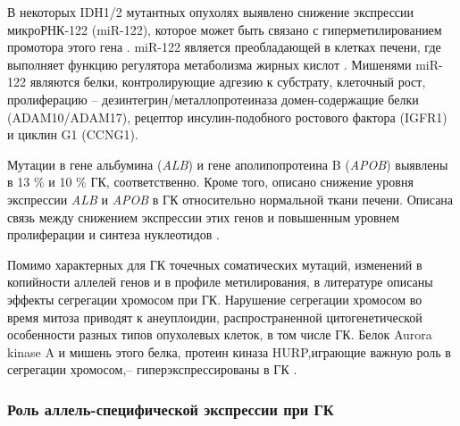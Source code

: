 В некоторых IDH1/2 мутантных опухолях выявлено снижение экспрессии микроРНК-122 (miR-122), которое может быть связано с гиперметилированием промотора этого гена \cite{cancer_genome_atlas_research_network._electronic_address:_wheelerbcm.edu_comprehensive_2017}. miR-122 является преобладающей в клетках печени, где выполняет функцию регулятора метаболизма жирных кислот \cite{liu_mir-122_2014}. Мишенями miR-122 являются белки, контролирующие адгезию к субстрату, клеточный рост, пролиферацию – дезинтегрин/металлопротеиназа домен-содержащие белки (ADAM10/ADAM17), рецептор инсулин-подобного ростового фактора (IGFR1) и циклин G1 (CCNG1).

Мутации в гене альбумина (\textit{ALB}) и гене аполипопротеина B (\textit{APOB}) выявлены в 13 \% и 10 \% ГК, соответственно. Кроме того, описано снижение уровня экспрессии \textit{ALB} и \textit{APOB} в ГК относительно нормальной ткани печени. Описана связь между снижением экспрессии этих генов и повышенным уровнем пролиферации и синтеза нуклеотидов \cite{cancer_genome_atlas_research_network._electronic_address:_wheelerbcm.edu_comprehensive_2017}.

Помимо характерных для ГК точечных соматических мутаций, изменений в копийности аллелей генов и в профиле метилирования, в литературе описаны эффекты сегрегации хромосом при ГК. Нарушение сегрегации хромосом во время митоза приводят к анеуплоидии, распространенной цитогенетической особенности разных типов опухолевых клеток, в том числе ГК. Белок Aurora kinase A и мишень этого белка, протеин киназа HURP,играющие важную роль в сегрегации хромосом,– гиперэкспрессированы в ГК \cite{farazi_hepatocellular_2006}.

\subsubsection{Роль аллель-специфической экспрессии при ГК}

